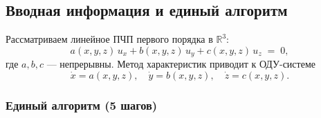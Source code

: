 \subsection{Вводная информация и единый алгоритм}\label{sec:pde-intro-algorithm}

Рассматриваем линейное ПЧП первого порядка в $\mathbb{R}^3$:
\[
a(x,y,z)\,u_x + b(x,y,z)\,u_y + c(x,y,z)\,u_z \;=\; 0,
\]
где $a,b,c$ — непрерывны. Метод характеристик приводит к ОДУ-системе
\[
\dot x = a(x,y,z),\quad \dot y = b(x,y,z),\quad \dot z = c(x,y,z).
\]


\subsubsection{Единый алгоритм (5 шагов)}

